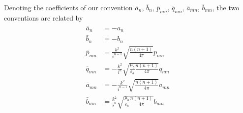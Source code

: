 \documentclass[11pt]{article}
\begin{document}
Denoting the coefficients of our convention $\bar a_n$, $\bar b_n$, $\bar p_{mn}$, $\bar q_{mn}$, $\bar a_{mn}$, $\bar b_{mn}$, the two conventions are related by
\begin{align}
\begin{split}
    \bar a_{n} &= - a_{n} \\
    \bar b_{n} &= - b_{n} \\
    \bar p_{mn} &= \frac{k^2}{i^{n-1}}\sqrt{\frac{n(n+1)}{4\pi}} p_{mn} \\
    \bar q_{mn} &= -\frac{k^2}{i^n}\sqrt{\frac{\mu_b}{\varepsilon_b} \frac{n(n+1)}{4\pi}} q_{mn} \\
    \bar a_{mn} &= -\frac{k^2}{i^{n-1}}\sqrt{\frac{n(n+1)}{4\pi}} a_{mn} \\
    \bar b_{mn} &= \frac{k^2}{i^n}\sqrt{\frac{\mu_b}{\varepsilon_b} \frac{n(n+1)}{4\pi}} b_{mn}
\end{split}
\end{align}


{}
\end{document}
